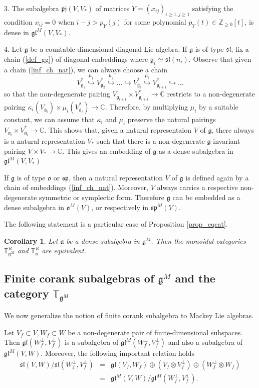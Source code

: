 \documentclass{svmult}
\newtheorem{cor}[theo]{Corollary}
\newcommand {\ZZ} {\mathbb {Z}}
\newcommand {\CC} {\mathbb {C}}
\newcommand{\TT}{\mathbb{T}}
\renewcommand{\sp}{\mathfrak{sp}}
\renewcommand{\sl}{\mathfrak{sl}}
\newcommand{\oj}{\mathfrak{g}}
\newcommand{\oo}{\mathfrak{o}}
\renewcommand{\aa}{\mathfrak{a}}
\renewcommand{\gg}{\mathfrak{g}}
\newcommand{\gl}{\mathfrak{gl}}
\begin{document}
3.  The subalgebra $\mathfrak{pj}(V,V_*)$ of matrices $Y=(x_{ij})_{i\geq1,j\geq1}$ satisfying the condition $x_{ij}=0$ when 
$i-j>p_Y(j)$ for some polynomial $p_Y(t) \in \ZZ_{\geq0}[t]$, is dense in $\gl^M(V,V_*)$.

4. Let $\gg$ be a countable-dimensional diagonal Lie algebra. If $\gg$ is of type $\sl$,  
fix a chain (\ref{def_gg}) of diagonal embeddings where $\gg_i \simeq \sl(n_i)$. Observe that given a chain (\ref{inf_ch_nat}), we can always choose a chain
$$V^*_{\oj_{1}} \stackrel{\mu_1}{\hookrightarrow} V^*_{\oj_{2}} \stackrel{\mu_2}{\hookrightarrow}  \dots \hookrightarrow V^*_{\oj_{i}} \stackrel{\mu_i}{\hookrightarrow} V^*_{\oj_{i+1}} \hookrightarrow \dots$$ so that the non-degenerate pairing 
$V_{\oj_{i+1}} \times V^*_{\oj_{i+1}} \rightarrow \CC$ restricts to a non-degenerate pairing $\kappa_i(V_{\oj_i}) \times \mu_i(V^*_{\oj_i}) \rightarrow \CC$. 
Therefore, by multiplying $\mu_i$ by a suitable constant, we can assume that $\kappa_i$ and $\mu_i$ preserve the natural pairings 
$V_{\oj_i} \times V^*_{\oj_i} \rightarrow \CC$. 
This shows that, given a natural representaion $V$ of $\gg$, there always is a natural representation $V_*$ such that there is a non-degenerate $\oj$-invariant pairing $V \times V_* \rightarrow \CC$. 
This gives an embedding of $\gg$ as a dense subalgebra in $\gl^M(V,V_*)$


If $\gg$ is of type $\oo$ or $\sp$, then a natural representation $V$ of $\gg$ is defined again by a chain of embeddings (\ref{inf_ch_nat}). Moreover, $V$ always carries a respective non-degenerate symmetric or symplectic form. Therefore $\gg$ can be embedded as a dense subalgebra in $\oo^M(V)$, or respectively in $\sp^M(V)$. 

The following statement is a particular case of Proposition \ref{prop_eqcat}. 

\begin{cor}\label{prop_squot} Let $\aa$ be a dense subalgebra in $\gg^M$. Then the monoidal categories $\TT^R_{\gg^M}$ and $\TT^R_{\aa}$ are equivalent.
\end{cor}

\subsection {Finite corank subalgebras of $\gg^M$ and the category $\TT_{\gg^M}$}\label{sect:7.3} 
We now generalize the notion of finite corank subalgebra to Mackey Lie algebras.

Let $V_f\subset V, W_f\subset W$ be a non-degenerate pair of finite-dimensional subspaces. Then $\gl(W_f^\perp,V_f^\perp)$ is a subalgebra of $\gl^M(W_f^\perp,V_f^\perp)$ and also a subalgebra of   
$\gl^M(V,W)$. Moreover, the following important relation holds
\begin{eqnarray}\label{gl}
\sl(V,W)/\sl(W_f^\perp,V_f^\perp)&=&\gl(V_f,W_f)\oplus (V_f\otimes V_f^\perp) \oplus (W_f^\perp\otimes W_f) \nonumber\\
&=&\gl^M(V,W)/\gl^M(W_f^\perp,V_f^\perp).
\end{eqnarray} 
\end{document}
